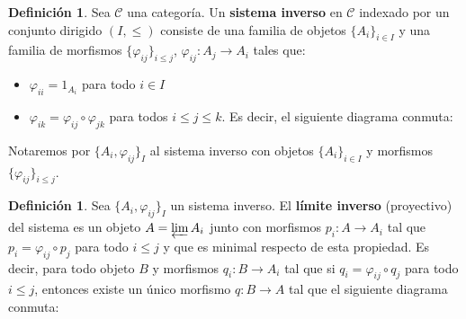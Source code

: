 \documentclass[12pt]{book}
\theoremstyle{definition}
\newtheorem{defn}[teo]{Definición}
\begin{document}
\begin{defn}
Sea $\mathscr{C}$ una categoría. Un \textbf{sistema inverso} en $\mathscr{C}$ indexado por un conjunto dirigido $(I,\leq)$ consiste de una familia de objetos $\{A_i\}_{i\in I}$ y una familia de morfismos $\{\varphi_{ij}\}_{i\leq j}$, $\varphi_{ij}:A_j\to A_i$ tales que: \begin{itemize}\item $\varphi_{ii} = 1_{A_i}$ para todo $i\in I$\item $\varphi_{ik} = \varphi_{ij}\circ\varphi_{jk}$ para todos $i\leq j\leq k$. Es decir, el siguiente diagrama conmuta:
\begin{center}
\end{center}\end{itemize}
Notaremos por $\{A_i,\varphi_{ij}\}_{I}$ al sistema inverso con objetos $\{A_i\}_{i\in I}$ y morfismos $\{\varphi_{ij}\}_{i\leq j}$.
\end{defn}

\begin{defn}
Sea $\{A_i,\varphi_{ij}\}_{I}$ un sistema inverso. El \textbf{límite inverso} (proyectivo) del sistema es un objeto $A=\varprojlim A_i$ junto con morfismos $p_i:A\to A_i$ tal que $p_i = \varphi_{ij}\circ p_j$ para todo $i\leq j$ y que es minimal respecto de esta propiedad. Es decir, para todo objeto $B$ y morfismos $q_i:B\to A_i$ tal que si $q_i=\varphi_{ij}\circ q_j$ para todo $i\leq j$, entonces existe un único morfismo $q:B\to A$ tal que el siguiente diagrama conmuta:
\begin{center}
\end{center}
\end{defn}
\end{document}
